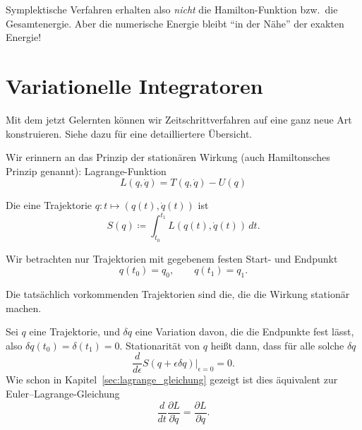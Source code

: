 Symplektische Verfahren erhalten also \emph{nicht} die Hamilton-Funktion bzw.\ die Gesamtenergie. Aber die numerische Energie bleibt \enquote{in der Nähe} der exakten Energie!


\section{Variationelle Integratoren}

Mit dem jetzt Gelernten können wir Zeitschrittverfahren auf eine ganz neue Art konstruieren.
Siehe dazu \cite{marsden_west:2001} für eine detailliertere Übersicht.

Wir erinnern an das Prinzip der stationären Wirkung (auch Hamiltonsches Prinzip genannt): 
Lagrange-Funktion
\begin{equation*}
	L(q,\dot q) = T(q,\dot q) - U(q)
\end{equation*}

\begin{definition}
	Die  eine Trajektorie $q\colon t\mapsto (q(t),\dot q(t))$ ist
	\begin{equation*}
		S(q)\coloneqq \int_{t_0}^{t_1} L(q(t),\dot q(t))\,dt.
	\end{equation*}
\end{definition}

Wir betrachten nur Trajektorien mit gegebenem festen Start- und Endpunkt
\begin{equation*}
	q(t_0) = q_0,\qquad q(t_1) = q_1.
\end{equation*}

\begin{definition}
	Die tatsächlich vorkommenden Trajektorien sind die, die die Wirkung stationär machen.
\end{definition}

Sei $q$ eine Trajektorie, und $\delta q$ eine Variation davon, die die Endpunkte fest lässt, also $\delta q(t_0)=\delta(t_1) = 0$.
Stationarität von $q$ heißt dann, dass für alle solche $\delta q$
\begin{equation*}
	\frac{d}{d\epsilon} S(q+\epsilon\delta q)\big\vert_{\epsilon=0} = 0.
\end{equation*}
Wie schon in Kapitel~\ref{sec:lagrange_gleichung} gezeigt ist dies äquivalent zur Euler--Lagrange-Gleichung
\begin{equation*}
	\frac{d}{dt}\frac{\partial L}{\partial \dot q} = \frac{\partial L}{\partial q}.
\end{equation*}

